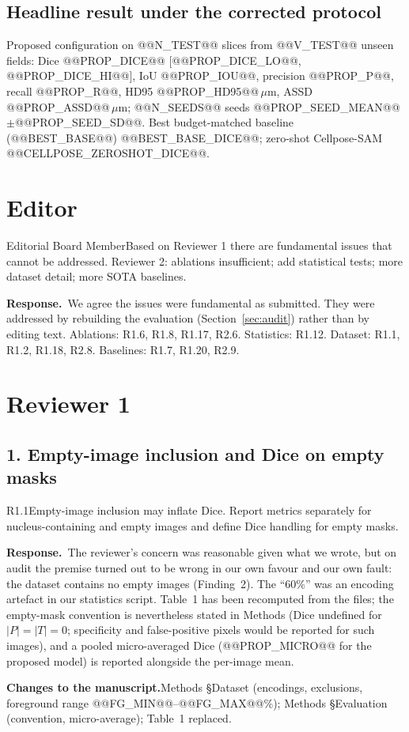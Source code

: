 \documentclass[11pt]{article}
\newcommand{\response}{\par\medskip\noindent\textbf{\color{bblue}Response.}\ }
\newcommand{\actions}{\par\medskip\noindent\textbf{Changes to the manuscript.}}
\begin{document}
\subsection*{Headline result under the corrected protocol}
Proposed configuration on @@N_TEST@@ slices from @@V_TEST@@ unseen fields: Dice @@PROP_DICE@@ [@@PROP_DICE_LO@@, @@PROP_DICE_HI@@], IoU @@PROP_IOU@@, precision @@PROP_P@@, recall @@PROP_R@@, HD95 @@PROP_HD95@@\,$\mu$m, ASSD @@PROP_ASSD@@\,$\mu$m; @@N_SEEDS@@ seeds @@PROP_SEED_MEAN@@$\pm$@@PROP_SEED_SD@@. Best budget-matched baseline (@@BEST_BASE@@) @@BEST_BASE_DICE@@; zero-shot Cellpose-SAM @@CELLPOSE_ZEROSHOT_DICE@@.

\section{Editor}
\begin{rcomment}{Editorial Board Member}Based on Reviewer 1 there are fundamental issues that cannot be addressed. Reviewer 2: ablations insufficient; add statistical tests; more dataset detail; more SOTA baselines.\end{rcomment}
\response We agree the issues were fundamental as submitted. They were addressed by rebuilding the evaluation (Section~\ref{sec:audit}) rather than by editing text. Ablations: R1.6, R1.8, R1.17, R2.6. Statistics: R1.12. Dataset: R1.1, R1.2, R1.18, R2.8. Baselines: R1.7, R1.20, R2.9.

\section{Reviewer 1}
\subsection*{1. Empty-image inclusion and Dice on empty masks}
\begin{rcomment}{R1.1}Empty-image inclusion may inflate Dice. Report metrics separately for nucleus-containing and empty images and define Dice handling for empty masks.\end{rcomment}
\response The reviewer's concern was reasonable given what we wrote, but on audit the premise turned out to be wrong in our own favour and our own fault: the dataset contains no empty images (Finding~2). The ``60\%'' was an encoding artefact in our statistics script. Table~1 has been recomputed from the files; the empty-mask convention is nevertheless stated in Methods (Dice undefined for $|P|=|T|=0$; specificity and false-positive pixels would be reported for such images), and a pooled micro-averaged Dice (@@PROP_MICRO@@ for the proposed model) is reported alongside the per-image mean.
\actions Methods §Dataset (encodings, exclusions, foreground range @@FG_MIN@@--@@FG_MAX@@\%); Methods §Evaluation (convention, micro-average); Table~1 replaced.
\end{document}
